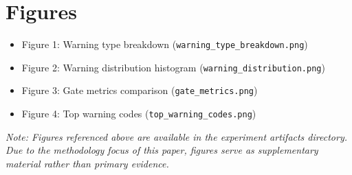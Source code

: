 \appendix
\section{Figures}

\begin{itemize}
    \item Figure 1: Warning type breakdown (\texttt{warning\_type\_breakdown.png})
    \item Figure 2: Warning distribution histogram (\texttt{warning\_distribution.png})
    \item Figure 3: Gate metrics comparison (\texttt{gate\_metrics.png})
    \item Figure 4: Top warning codes (\texttt{top\_warning\_codes.png})
\end{itemize}

\textit{Note: Figures referenced above are available in the experiment artifacts directory. Due to the methodology focus of this paper, figures serve as supplementary material rather than primary evidence.}
